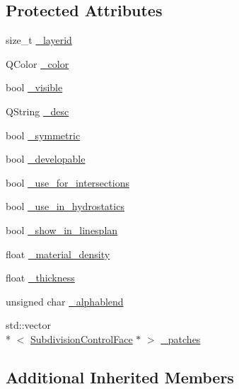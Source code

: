 \subsection*{Protected Attributes}
\begin{DoxyCompactItemize}
\item 
size\-\_\-t \hyperlink{classShipCADGeometry_1_1SubdivisionLayer_a8c13850079e9af7429f410e8c74699b8}{\-\_\-layerid}
\item 
Q\-Color \hyperlink{classShipCADGeometry_1_1SubdivisionLayer_a761c7aba109a7b6804d38394afcecd43}{\-\_\-color}
\item 
bool \hyperlink{classShipCADGeometry_1_1SubdivisionLayer_aaf8127c4c895e6fb13d2281ae2e5e5ff}{\-\_\-visible}
\item 
Q\-String \hyperlink{classShipCADGeometry_1_1SubdivisionLayer_a6a3e5be6a7582173e1d21c1b602fcdf3}{\-\_\-desc}
\item 
bool \hyperlink{classShipCADGeometry_1_1SubdivisionLayer_aff0dc8cd1738cf77e4d9f21e32e1e871}{\-\_\-symmetric}
\item 
bool \hyperlink{classShipCADGeometry_1_1SubdivisionLayer_a345debb0ab6c8cb47390e26b42db6c19}{\-\_\-developable}
\item 
bool \hyperlink{classShipCADGeometry_1_1SubdivisionLayer_a569c2fceb937af23e69f824a98194738}{\-\_\-use\-\_\-for\-\_\-intersections}
\item 
bool \hyperlink{classShipCADGeometry_1_1SubdivisionLayer_a3936e3f018cf47ab79df20b83aaddb07}{\-\_\-use\-\_\-in\-\_\-hydrostatics}
\item 
bool \hyperlink{classShipCADGeometry_1_1SubdivisionLayer_afcd5fafc70f5c2ab0daf579c55f36dc5}{\-\_\-show\-\_\-in\-\_\-linesplan}
\item 
float \hyperlink{classShipCADGeometry_1_1SubdivisionLayer_ac68f5ccf5f32d072ba54d1000e1fb5d3}{\-\_\-material\-\_\-density}
\item 
float \hyperlink{classShipCADGeometry_1_1SubdivisionLayer_a4bdebcd4814a97931dad6865caee0554}{\-\_\-thickness}
\item 
unsigned char \hyperlink{classShipCADGeometry_1_1SubdivisionLayer_a9797f92ac85b0e981ce8c78bd104c112}{\-\_\-alphablend}
\item 
std\-::vector\\*
$<$ \hyperlink{classShipCADGeometry_1_1SubdivisionControlFace}{Subdivision\-Control\-Face} $\ast$ $>$ \hyperlink{classShipCADGeometry_1_1SubdivisionLayer_ae352b98eddb1f238a61f91417f9649dd}{\-\_\-patches}
\end{DoxyCompactItemize}
\subsection*{Additional Inherited Members}


